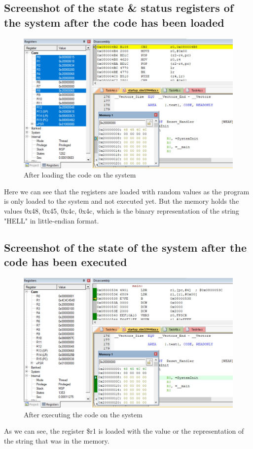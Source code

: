 \documentclass[footheight=20pt, footsepline, headheight=20pt, headsepline]{scrartcl}
\begin{document}
\subsection*{Screenshot of the state \& status registers of the system after the code has been loaded}
\begin{figure}[ht]
    \centering
    \includegraphics[scale=.7]{images/Task4a_Before1.jpg}
    \caption{After loading the code on the system}
    \label{fig:before_task_4a}
\end{figure}
\FloatBarrier
Here we can see that the registers are loaded with random values as the program is only loaded to the system and not executed yet. But the memory holds the values 0x48, 0x45, 0x4c, 0x4c, which is the binary representation of the string "HELL" in little-endian format.
\subsection*{Screenshot of the state of the system after the code has been executed}
\begin{figure}[h!]
    \centering
    \includegraphics[scale=.7]{images/Task4a_After1.jpg}
    \caption{After executing the code on the system}
    \label{fig:after_task_4a}
\end{figure}
\FloatBarrier
As we can see, the register \$r1 is loaded with the value or the representation of the string that was in the memory.
\end{document}
